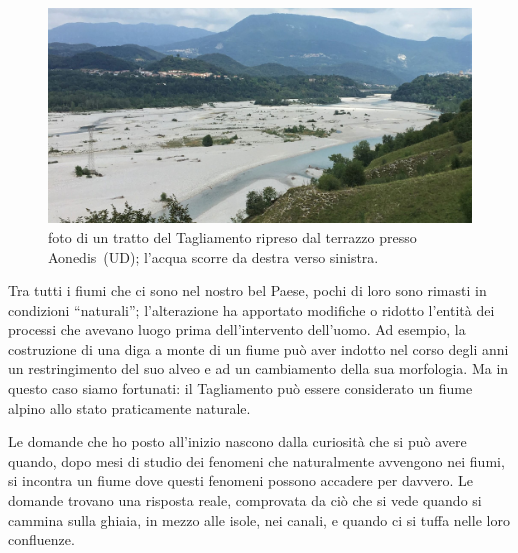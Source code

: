 \begin{figure}
	\centering
	\includegraphics[width=\textwidth]{files/foto_terrazzo_valle_pinzano.jpg}
	\caption[foto di un tratto del Tagliamento ripreso dal terrazzo presso Aonedis~(UD)]{foto di un tratto del Tagliamento ripreso dal terrazzo presso Aonedis~(UD); l'acqua scorre da destra verso sinistra. 
	}
	\label{fig:foto-pinzano}
\end{figure}


Tra tutti i fiumi che ci sono nel nostro bel Paese, pochi di loro sono rimasti in condizioni “naturali”; l'alterazione ha apportato modifiche o ridotto l'entità dei processi che avevano luogo prima dell'intervento dell'uomo. 
Ad esempio, la costruzione di una diga a monte di un fiume può aver indotto nel corso degli anni un restringimento del suo alveo e ad un cambiamento della sua morfologia.
Ma in questo caso siamo fortunati: il Tagliamento può essere considerato un fiume alpino allo stato praticamente naturale.

Le domande che ho posto all'inizio nascono dalla curiosità che si può avere quando, dopo mesi di studio dei fenomeni che naturalmente avvengono nei fiumi, si incontra un fiume dove questi fenomeni possono accadere per davvero. Le domande trovano una risposta reale, comprovata da ciò che si vede quando si cammina sulla ghiaia, in mezzo alle isole, nei canali, e quando ci si tuffa nelle loro confluenze.

